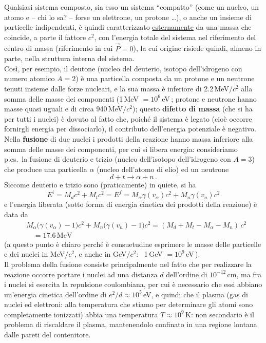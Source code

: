 Qualsiasi sistema composto, sia esso un sistema ``compatto'' (come un nucleo, un
atomo e -- chi lo sa? -- forse un elettrone, un protone \dots), o anche un
insieme di particelle indipendenti, \`e quindi caratterizzato
\underline{esternamente} da una massa che coincide, a parte il fattore $c^2$,
con l'energia totale del sistema nel riferimento del centro di massa
(riferimento in cui $\vec P=0$), la cui origine risiede quindi, almeno in parte,
nella struttura interna del sistema.\\
Cos\`i, per esempio, il deutone (nucleo del deuterio, isotopo dell'idrogeno con
numero atomico $A=2$) \`e una particella composta da un protone e un neutrone
tenuti insieme dalle forze nucleari, e la sua massa \`e inferiore di
2.2\,MeV$/c^2$ alla somma delle masse dei componenti (1\,MeV $=10^6$\,eV\,;
protone e neutrone hanno masse quasi uguali e di circa 940\,MeV$/c^2$); questo
\textbf{difetto di massa} (che si ha per tutti i nuclei) \`e dovuto al fatto
che, poich\'e il sistema \`e legato (cio\`e occorre fornirgli energia per
dissociarlo), il contributo dell'energia potenziale \`e negativo.\\
Nella \textbf{fusione} di due nuclei i prodotti della reazione hanno massa
inferiore alla somma delle masse dei componenti, per cui si libera energia:
consideriamo p.es.\ la fusione di deuterio e trizio (nucleo dell'isotopo
dell'idrogeno con $A=3$) che produce una particella $\alpha$ (nucleo dell'atomo
di elio) ed un neutrone
\begin{equation}
  d+t\to\alpha+n\,.
  \tag{5.29}
\end{equation}
Siccome deuterio e trizio sono (praticamente) in quiete, si ha
\begin{equation}
  E^i=M_dc^2+M_tc^2=E^f=M_\alpha\gamma(v_\alpha)c^2+M_n\gamma(v_n)c^2
  \tag{5.30}
\end{equation}
e l'energia liberata (sotto forma di energia cinetica dei prodotti della
reazione) \`e data da
\begin{equation}
  \begin{aligned}
    &M_\alpha\big(\gamma(v_\alpha)-1\big)c^2
    +M_n\big(\gamma(v_n)-1\big)c^2=(M_d+M_t-M_\alpha-M_n)\,c^2\\
    &\quad=17.6\,\mathrm{MeV}
  \end{aligned}
  \tag{5.31}
\end{equation}
(a questo punto \`e chiaro perch\'e \`e consuetudine esprimere le masse delle
particelle e dei nuclei in MeV$/c^2$, e anche in GeV$/c^2$: \ 1\,GeV
$=10^9$\,eV\,).\\
Il problema della fusione consiste principalmente nel fatto che per realizzare
la reazione occorre portare i nuclei ad una distanza $d$ dell'ordine di
$10^{-12}$\,cm, ma fra i nuclei si esercita la repulsione coulombiana, per cui
\`e necessario che essi abbiano un'energia cinetica dell'ordine di
$e^2/d\approx10^5$\,eV, e quindi che il plasma (gas di nuclei ed elettroni: alla
temperatura che stiamo per determinare gli atomi sono completamente ionizzati)
abbia una temperatura $T\approx10^9$\,K: non secondario \`e il problema di
riscaldare il plasma, mantenendolo confinato in una regione lontana dalle pareti
del contenitore.

